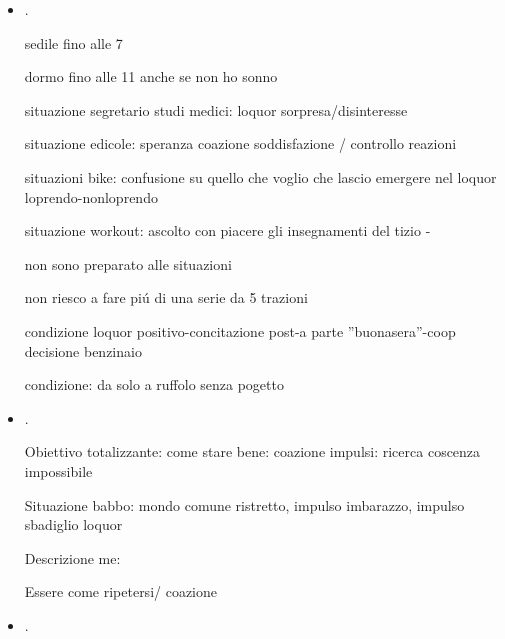 \begin{itemize}
workout bike dimentico obiettivo

cibo vs stanchezza: devo pranzare e vorrei dormire ma alla fine riesco a prendere il caf\'e

post pisolo sono intrappolato da ascolto discorsi/paura interazioni
condizione lezione shore fino a workout

/keyword{pronto per evitare riflesso inadeguatezza}: ti fotto

condizione post cena doccia 


\item {}.

sedile fino alle 7

dormo fino alle 11 anche se non ho sonno


situazione segretario studi medici: loquor sorpresa/disinteresse

situazione edicole: speranza coazione soddisfazione / controllo reazioni

situazioni bike: confusione su quello che voglio che lascio emergere nel loquor loprendo-nonloprendo

situazione workout: ascolto con piacere gli insegnamenti del tizio - 

non sono preparato alle situazioni

non riesco a fare pi\'u di una serie da 5 trazioni

condizione loquor positivo-concitazione post-a parte ''buonasera''-coop decisione benzinaio

condizione: da solo a ruffolo senza pogetto

\item {}.

Obiettivo totalizzante: come stare bene: coazione impulsi: ricerca coscenza impossibile


Situazione babbo: mondo comune ristretto, impulso imbarazzo, impulso sbadiglio loquor

Descrizione me: 

Essere come ripetersi/ coazione


\item {}.


\end{itemize}
